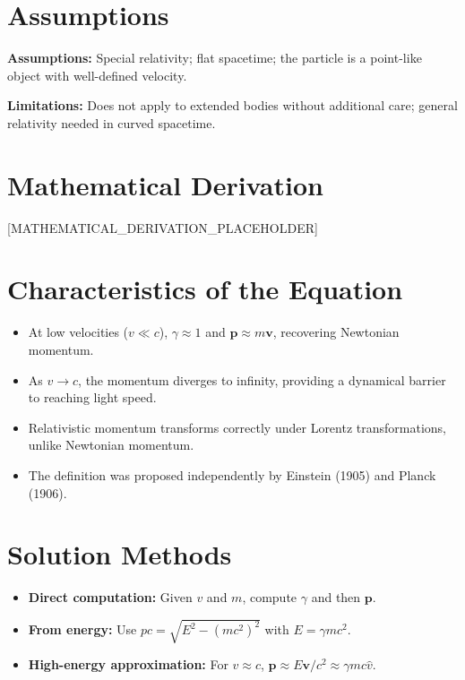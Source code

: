 \documentclass[11pt,openright]{book}
\begin{document}
\section*{Assumptions}

\textbf{Assumptions:} Special relativity; flat spacetime; the particle is a point-like object with well-defined velocity.


\textbf{Limitations:} Does not apply to extended bodies without additional care; general relativity needed in curved spacetime.


\section*{Mathematical Derivation}

[MATHEMATICAL_DERIVATION_PLACEHOLDER]

\section*{Characteristics of the Equation}

\begin{itemize}
    \item At low velocities ($v \ll c$), $\gamma \approx 1$ and $\mathbf{p} \approx m\mathbf{v}$, recovering Newtonian momentum.
    \item As $v \to c$, the momentum diverges to infinity, providing a dynamical barrier to reaching light speed.
    \item Relativistic momentum transforms correctly under Lorentz transformations, unlike Newtonian momentum.
    \item The definition was proposed independently by Einstein (1905) and Planck (1906).
\end{itemize}
\section*{Solution Methods}

\begin{itemize}
    \item \textbf{Direct computation:} Given $v$ and $m$, compute $\gamma$ and then $\mathbf{p}$.
    \item \textbf{From energy:} Use $pc = \sqrt{E^2 - (mc^2)^2}$ with $E = \gamma mc^2$.
    \item \textbf{High-energy approximation:} For $v \approx c$, $\mathbf{p} \approx E\mathbf{v}/c^2 \approx \gamma mc \hat{v}$.
\end{itemize}
\end{document}
